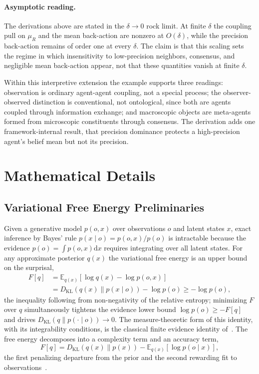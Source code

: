 \documentclass[11pt]{article}
\begin{document}
\paragraph{Asymptotic reading.} The derivations above are stated in the $\delta \to 0$ rock limit. At finite $\delta$ the coupling pull on $\mu_R$ and the mean back-action are nonzero at $O(\delta)$, while the precision back-action remains of order one at every $\delta$. The claim is that this scaling sets the regime in which insensitivity to low-precision neighbors, consensus, and negligible mean back-action appear, not that these quantities vanish at finite $\delta$.

Within this interpretive extension the example supports three readings: observation is ordinary agent-agent coupling, not a special process; the observer-observed distinction is conventional, not ontological, since both are agents coupled through information exchange; and macroscopic objects are meta-agents formed from microscopic constituents through consensus. The derivation adds one framework-internal result, that precision dominance protects a high-precision agent's belief mean but not its precision.

\section{Mathematical Details}
\label{app:math}

\subsection{Variational Free Energy Preliminaries}
\label{app:variational_prelim}

Given a generative model $p(o, x)$ over observations $o$ and latent states $x$, exact inference by Bayes' rule $p(x \mid o) = p(o, x)/p(o)$ is intractable because the evidence $p(o) = \int p(o, x)\mathrm{d}x$ requires integrating over all latent states. For any approximate posterior $q(x)$ the variational free energy is an upper bound on the surprisal,
\begin{equation}
\begin{aligned}
F[q] &= \mathbb{E}_{q(x)}[\log q(x) - \log p(o, x)] \\
&= D_{\mathrm{KL}}(q(x) \| p(x \mid o)) - \log p(o) \geq -\log p(o),
\end{aligned}
\end{equation}
the inequality following from non-negativity of the relative entropy; minimizing $F$ over $q$ simultaneously tightens the evidence lower bound $\log p(o) \geq -F[q]$ and drives $D_{\mathrm{KL}}(q \| p(\cdot \mid o)) \to 0$. The measure-theoretic form of this identity, with its integrability conditions, is the classical finite evidence identity of~\cite[Ch.~5]{DennisGaugeVFE2026}. The free energy decomposes into a complexity term and an accuracy term,
\begin{equation}
F[q] = D_{\mathrm{KL}}(q(x) \| p(x)) - \mathbb{E}_{q(x)}[\log p(o \mid x)],
\end{equation}
the first penalizing departure from the prior and the second rewarding fit to observations~\cite{Friston2010, parr2022active}.
\end{document}
